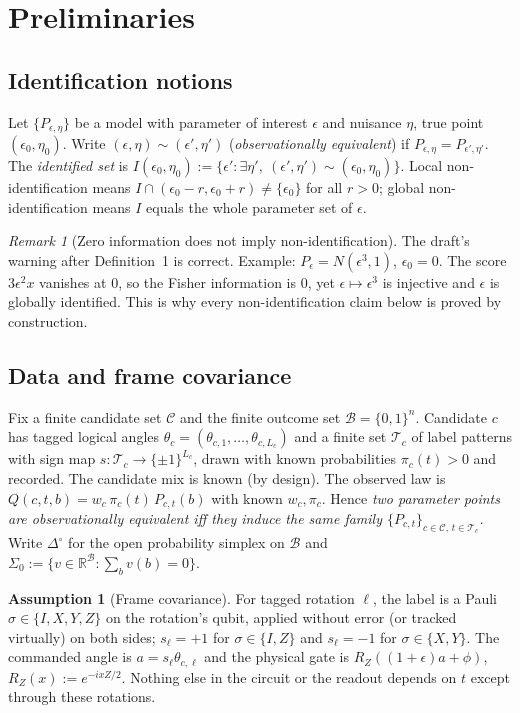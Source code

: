 \documentclass[11pt,a4paper]{article}
\theoremstyle{definition}
\newtheorem{assumption}{Assumption}
\theoremstyle{remark}
\newtheorem{remark}[theorem]{Remark}
\newcommand{\R}{\mathbb{R}}
\newcommand{\B}{\mathcal{B}}
\newcommand{\C}{\mathcal{C}}
\newcommand{\T}{\mathcal{T}}
\newcommand{\simp}{\Delta^{\circ}}
\newcommand{\eps}{\epsilon}
\newcommand{\RZ}{R_Z}
\begin{document}
\section{Preliminaries}

\subsection{Identification notions}
Let $\{P_{\eps,\eta}\}$ be a model with parameter of interest $\eps$ and nuisance
$\eta$, true point $(\eps_0,\eta_0)$. Write $(\eps,\eta)\sim(\eps',\eta')$
(\emph{observationally equivalent}) if $P_{\eps,\eta}=P_{\eps',\eta'}$. The
\emph{identified set} is $I(\eps_0,\eta_0):=\{\eps' : \exists\eta',\
(\eps',\eta')\sim(\eps_0,\eta_0)\}$. Local non-identification means
$I\cap(\eps_0-r,\eps_0+r)\neq\{\eps_0\}$ for all $r>0$; global
non-identification means $I$ equals the whole parameter set of $\eps$.

\begin{remark}[Zero information does not imply non-identification]
The draft's warning after Definition~1 is correct. Example: $P_\eps=N(\eps^3,1)$,
$\eps_0=0$. The score $3\eps^2 x$ vanishes at $0$, so the Fisher information is $0$,
yet $\eps\mapsto\eps^3$ is injective and $\eps$ is globally identified. This is why
every non-identification claim below is proved by construction.
\end{remark}

\subsection{Data and frame covariance}
Fix a finite candidate set $\C$ and the finite outcome set $\B=\{0,1\}^n$.
Candidate $c$ has tagged logical angles $\theta_c=(\theta_{c,1},\dots,\theta_{c,L_c})$
and a finite set $\T_c$ of label patterns with sign map $s:\T_c\to\{\pm1\}^{L_c}$,
drawn with known probabilities $\pi_c(t)>0$ and recorded. The candidate mix is
known (by design). The observed law is
$Q(c,t,b)=w_c\,\pi_c(t)\,P_{c,t}(b)$ with known $w_c,\pi_c$. Hence \emph{two
parameter points are observationally equivalent iff they induce the same family
$\{P_{c,t}\}_{c\in\C,\,t\in\T_c}$.} Write $\simp$ for the open probability simplex
on $\B$ and $\Sigma_0:=\{v\in\R^{\B}:\sum_b v(b)=0\}$.

\begin{assumption}[Frame covariance]\label{A:frame}
For tagged rotation $\ell$, the label is a Pauli $\sigma\in\{I,X,Y,Z\}$ on the
rotation's qubit, applied without error (or tracked virtually) on both sides;
$s_\ell=+1$ for $\sigma\in\{I,Z\}$ and $s_\ell=-1$ for $\sigma\in\{X,Y\}$. The
commanded angle is $a=s_\ell\theta_{c,\ell}$ and the physical gate is
$\RZ((1+\eps)a+\phi)$, $\RZ(x):=e^{-ixZ/2}$. Nothing else in the circuit or the
readout depends on $t$ except through these rotations.
\end{assumption}
\end{document}
